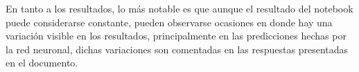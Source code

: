 \documentclass[12pt,a4paper,table]{article}
\begin{document}
En tanto a los resultados, lo más notable es que aunque el resultado del notebook puede considerarse constante, pueden observarse ocasiones en donde hay una variación visible en los resultados, principalmente en las predicciones hechas por la red neuronal, dichas variaciones son comentadas en las respuestas presentadas en el documento.
    
    
    
\end{document}
